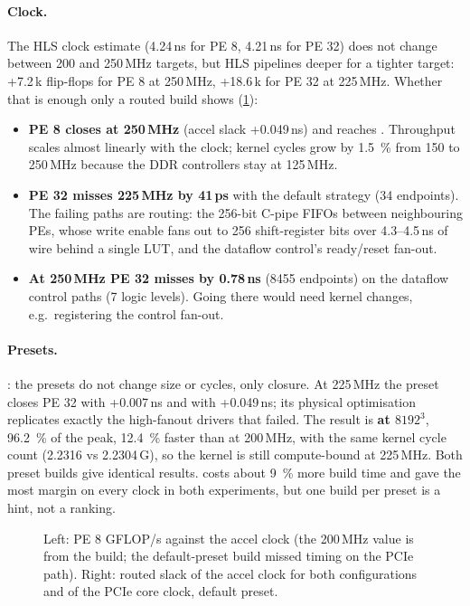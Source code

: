 \paragraph{Clock.} The HLS clock estimate (4.24\,ns for PE 8, 4.21\,ns for PE 32) does not change between
200 and 250\,MHz targets, but HLS pipelines deeper for a tighter target: +7.2\,k flip-flops for PE 8 at 250\,MHz,
+18.6\,k for PE 32 at 225\,MHz. Whether that is enough only a routed build shows (\cref{fig:clock}):
\begin{itemize}
  \item \textbf{PE 8 closes at 250\,MHz} (accel slack +0.049\,ns) and reaches . Throughput scales
        almost linearly with the clock; kernel cycles grow by \SI{1.5}{\percent} from 150 to 250\,MHz because the DDR
        controllers stay at 125\,MHz.
  \item \textbf{PE 32 misses 225\,MHz by 41\,ps} with the default strategy (34 endpoints). The failing paths are
        routing: the 256-bit C-pipe FIFOs between neighbouring PEs, whose write enable fans out to 256 shift-register
        bits over 4.3--4.5\,ns of wire behind a single LUT, and the dataflow control's ready/reset fan-out.
  \item \textbf{At 250\,MHz PE 32 misses by 0.78\,ns} (8455 endpoints) on the dataflow control paths (7 logic
        levels). Going there would need kernel changes, e.g.\ registering the control fan-out.
\end{itemize}

\paragraph{Presets.} : the presets do not change size or cycles, only closure. At 225\,MHz the
 preset closes PE 32 with +0.007\,ns and  with +0.049\,ns; its physical
optimisation replicates exactly the high-fanout drivers that failed. The result is \textbf{ at
\(8192^3\)}, \SI{96.2}{\percent} of the peak, \SI{12.4}{\percent} faster than at 200\,MHz, with the same kernel cycle
count (2.2316 vs 2.2304\,G), so the kernel is still compute-bound at 225\,MHz. Both preset builds give identical
results.  costs about \SI{9}{\percent} more build time and gave the most margin on every clock in
both experiments, but one build per preset is a hint, not a ranking.

\begin{figure}[ht]
  \centering
  
  \caption{Left: PE 8 GFLOP/s against the accel clock (the 200\,MHz value is from the  build; the
    default-preset build missed timing on the PCIe path). Right: routed slack of the accel clock for both
    configurations and of the PCIe core clock, default preset.}
  \label{fig:clock}
\end{figure}

